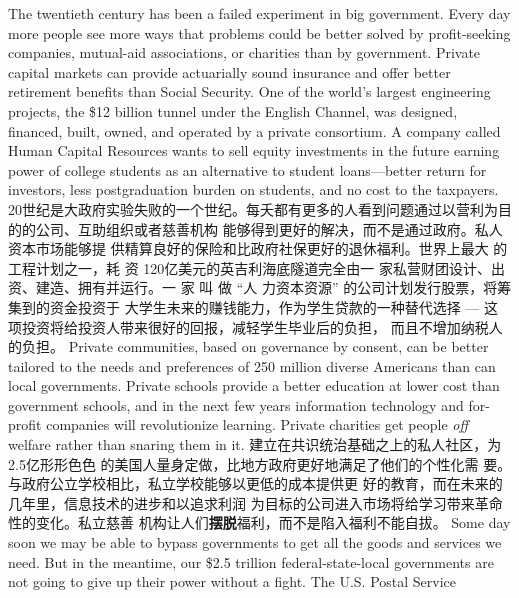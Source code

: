 \begin{paracol}{2}
The twentieth century has been a failed experiment in big government. Every day more people see more ways that problems
could be better solved by profit-seeking companies, mutual-aid associations, or charities than by government. Private capital
markets can provide actuarially sound insurance and offer better retirement benefits than Social Security. One of the world's
largest engineering projects, the \$12 billion tunnel under the
English Channel, was designed, financed, built, owned, and operated by a private consortium. A company called Human Capital Resources wants to sell equity investments in the future
earning power of college students as an alternative to student
loans---better return for investors, less postgraduation burden
on students, and no cost to the taxpayers.
\switchcolumn
20世纪是大政府实验失败的一个世纪。每夭都有更多的人看到问题通过以营利为目的的公司、互助组织或者慈善机构
能够得到更好的解决，而不是通过政府。私人资本市场能够提
供精算良好的保险和比政府社保更好的退休福利。世界上最大
的工程计划之一，耗 资 120亿美元的英吉利海底隧道完全由一
家私营财团设计、出资、建造、拥有并运行。一 家 叫 做 “人
力资本资源” 的公司计划发行股票，将筹集到的资金投资于
大学生未来的赚钱能力，作为学生贷款的一种替代选择 --- 这
项投资将给投资人带来很好的回报，减轻学生毕业后的负担，
而且不增加纳税人的负担。
\switchcolumn*
Private communities, based on governance by consent, can
be better tailored to the needs and preferences of 250 million
diverse Americans than can local governments. Private schools
provide a better education at lower cost than government
schools, and in the next few years information technology and
for-profit companies will revolutionize learning. Private charities get people \textit{off} welfare rather than snaring them in it.
\switchcolumn
建立在共识统治基础之上的私人社区，为2.5亿形形色色
的美国人量身定做，比地方政府更好地满足了他们的个性化需
要。与政府公立学校相比，私立学校能够以更低的成本提供更
好的教育，而在未来的几年里，信息技术的进步和以追求利润
为目标的公司进入市场将给学习带来革命性的变化。私立慈善
机构让人们\textbf{摆脱}福利，而不是陷入福利不能自拔。
\switchcolumn*
Some day soon we may be able to bypass governments to get
all the goods and services we need. But in the meantime, our
\$2.5 trillion federal-state-local governments are not going to
give up their power without a fight. The U.S. Postal Service

\end{paracol}
